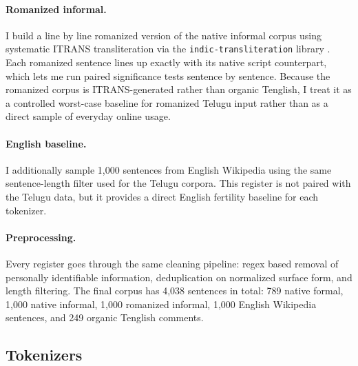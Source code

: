 ﻿\documentclass[11pt]{article}
\begin{document}
\paragraph{Romanized informal.}
I build a line by line romanized version of the native informal
corpus using systematic ITRANS transliteration via the
\texttt{indic-transliteration} library
\citep{kunchukuttan-2020-indicnlp}. Each romanized sentence lines up
exactly with its native script counterpart, which lets me run
paired significance tests sentence by sentence. Because the
romanized corpus is ITRANS-generated rather than organic Tenglish, I
treat it as a controlled worst-case baseline for romanized Telugu
input rather than as a direct sample of everyday online usage.

\paragraph{English baseline.}
I additionally sample 1,000 sentences from English Wikipedia using
the same sentence-length filter used for the Telugu corpora. This
register is not paired with the Telugu data, but it provides a direct
English fertility baseline for each tokenizer.

\paragraph{Preprocessing.}
Every register goes through the same cleaning pipeline: regex based
removal of personally identifiable information, deduplication on
normalized surface form, and length filtering. The final corpus has
4,038 sentences in total: 789 native formal, 1,000 native informal,
1,000 romanized informal, 1,000 English Wikipedia sentences, and 249 organic Tenglish comments.

\subsection{Tokenizers}
\end{document}
